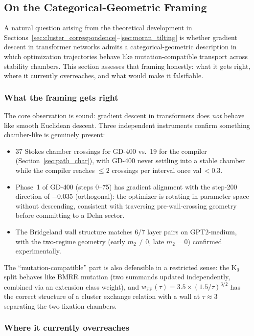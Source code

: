 \documentclass[11pt]{amsart}
\begin{document}
\subsection{On the Categorical-Geometric Framing}
\label{sec:framing}

A natural question arising from the theoretical development in
Sections~\ref{sec:cluster_correspondence}--\ref{sec:moran_tilting}
is whether gradient descent in transformer networks admits a
categorical-geometric description in which optimization trajectories
behave like mutation-compatible transport across stability chambers.
This section assesses that framing honestly: what it gets right,
where it currently overreaches, and what would make it falsifiable.

\subsubsection*{What the framing gets right}

The core observation is sound: gradient descent in transformers does
\emph{not} behave like smooth Euclidean descent.
Three independent instruments confirm something chamber-like is
genuinely present:
\begin{itemize}
\item 37 Stokes chamber crossings for GD-400 vs.\ 19 for the compiler
  (Section~\ref{sec:path_char}), with GD-400 never settling into a
  stable chamber while the compiler reaches $\leq 2$ crossings per
  interval once val\,$< 0.3$.
\item Phase~1 of GD-400 (steps 0--75) has gradient alignment with
  the step-200 direction of $-0.035$ (orthogonal): the optimizer is
  rotating in parameter space without descending, consistent with
  traversing pre-wall-crossing geometry before committing to a
  Dehn sector.
\item The Bridgeland wall structure matches 6/7 layer pairs on
  GPT2-medium, with the two-regime geometry (early $m_2 \neq 0$,
  late $m_2 = 0$) confirmed experimentally.
\end{itemize}

The ``mutation-compatible'' part is also defensible in a restricted
sense: the K$_0$ split behaves like BMRR mutation (two summands
updated independently, combined via an extension class weight),
and $w_\mathrm{FF}(\tau) = 3.5 \times (1.5/\tau)^{3/2}$ has the
correct structure of a cluster exchange relation with a wall at
$\tau \approx 3$ separating the two fixation chambers.

\subsubsection*{Where it currently overreaches}
\end{document}
